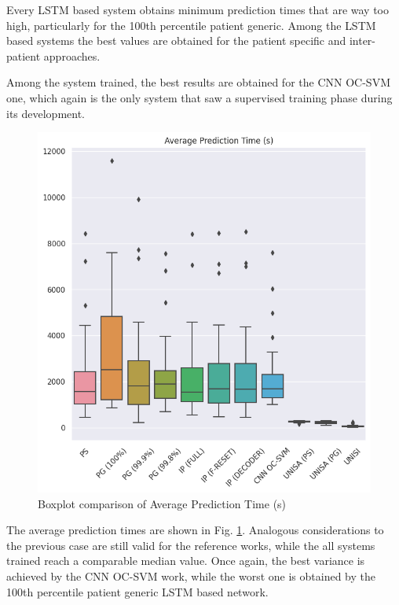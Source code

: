 Every \gls{LSTM} based system obtains minimum prediction times that are way too high, particularly for the 100th percentile patient generic. Among the \gls{LSTM} based systems the best values are obtained for the patient specific and inter-patient approaches. 

Among the system trained, the best results are obtained for the \gls{CNN} \gls{OC-SVM} one, which again is the only system that saw a supervised training phase during its development.

\begin{figure}[ht]
    \centering
    \includegraphics[width=1.0\textwidth]{images/Experimental-validation/boxplot_APT.png}
    \caption{Boxplot comparison of Average Prediction Time (s)}
    \label{fig:boxplot_APT}
\end{figure}

The average prediction times are shown in Fig. \ref{fig:boxplot_APT}. Analogous considerations to the previous case are still valid for the reference works, while the all systems trained reach a comparable median value. Once again, the best variance is achieved by the \gls{CNN} \gls{OC-SVM} work, while the worst one is obtained by the 100th percentile patient generic \gls{LSTM} based network.

